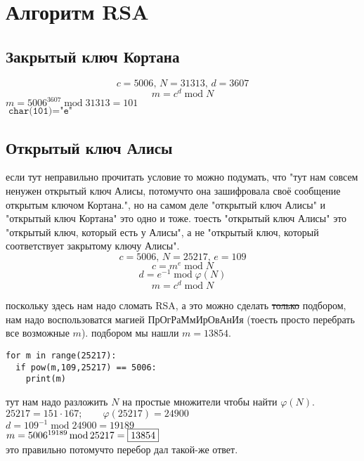 \documentclass{article}
\newcommand{\ds}{\displaystyle}
\begin{document}
  \section{Алгоритм RSA}
  \subsection{Закрытый ключ Кортана}
  $$ c=5006,\, N=31313,\, d=3607 $$
  $$ m = c^d \operatorname{mod} N $$
  $\ds m = 5006^{3607} \operatorname{mod} 31313 = 101$ \\
  $\texttt{char(101)} = \texttt{"{}e"{}}$

  \subsection{Открытый ключ Алисы}
  если тут неправильно прочитать условие то можно подумать,
  что "{}тут нам совсем ненужен открытый ключ Алисы, потомучто она зашифровала своё сообщение открытым ключом Кортана."{},
  но на самом деле "{}открытый ключ Алисы"{} и "{}открытый ключ Кортана"{} это одно и тоже.
  тоесть "{}открытый ключ Алисы"{} это "{}открытый ключ, который есть у Алисы"{},
  а не "{}открытый ключ, который соответствует закрытому ключу Алисы"{}.
  $$ c=5006,\, N=25217,\, e=109 $$
  $$ c = m^e \operatorname{mod} N $$
  $$ d = e^{-1} \operatorname{mod} \varphi(N) $$
  $$ m = c^d \operatorname{mod} N $$
  \begin{cross}
    поскольку здесь нам надо сломать RSA, а это можно сделать \sout{только} подбором,
    нам надо воспользоватся магией ПрОгРаМмИрОвАнИя (тоесть просто перебрать все возможные $m$).
    подбором мы нашли $m=13854$.
    \begin{center}
      \begin{BVerbatim}
for m in range(25217):
  if pow(m,109,25217) == 5006:
    print(m)
      \end{BVerbatim}
    \end{center}
  \end{cross}
  \noindent
  тут нам надо разложить $N$ на простые множители чтобы найти $\varphi(N)$. \\
  $ 25217 = 151 \cdot 167; \qquad \varphi(25217) = 24900 $ \\
  $ d = 109^{-1} \operatorname{mod} 24900 = 19189 $ \\
  $ m = 5006^{19189} \operatorname{mod} 25217 = \fbox{13854} $ \\
  это правильно потомучто перебор дал такой-же ответ.
\end{document}
